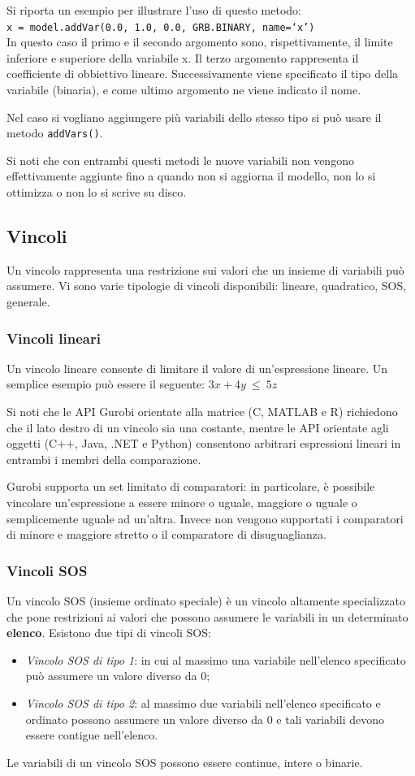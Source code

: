 Si riporta un esempio per illustrare l'uso di questo metodo:\\
\texttt{x = model.addVar(0.0, 1.0, 0.0, GRB.BINARY, name=`x')}\\
In questo caso il primo e il secondo argomento sono, rispettivamente, il limite inferiore e superiore della variabile x. Il terzo argomento rappresenta il coefficiente di obbiettivo lineare. Successivamente viene specificato il tipo della variabile (binaria), e come ultimo argomento ne viene indicato il nome.

Nel caso si vogliano aggiungere più variabili dello stesso tipo si può usare il metodo \texttt{addVars()}.

Si noti che con entrambi questi metodi le nuove variabili non vengono effettivamente aggiunte fino a quando non si aggiorna il modello, non lo si ottimizza o non lo si  scrive su disco.

\subsection{Vincoli}
Un vincolo rappresenta una restrizione sui valori che un insieme di variabili può assumere. Vi sono varie tipologie di vincoli disponibili: lineare, quadratico, SOS, generale.

\subsubsection*{Vincoli lineari}
Un vincolo lineare consente di limitare il valore di un'espressione lineare.
Un semplice esempio può essere il seguente:
$3x + 4y ~ \leq ~ 5z$

Si noti che le API Gurobi orientate alla matrice (C, MATLAB e R) richiedono che il lato destro di un vincolo sia una costante, mentre le API orientate agli oggetti (C++, Java, .NET e Python) consentono arbitrari espressioni lineari in entrambi i membri della comparazione.

Gurobi supporta un set limitato di comparatori: in particolare, è possibile vincolare un'espressione a essere minore o uguale, maggiore o uguale o semplicemente uguale ad un'altra. Invece non vengono supportati i comparatori di minore e maggiore stretto o il comparatore di disuguaglianza. 

\subsubsection*{Vincoli SOS}
Un vincolo SOS (insieme ordinato speciale) è un vincolo altamente specializzato che pone restrizioni ai valori che possono assumere le variabili in un determinato \textbf{elenco}.
Esistono due tipi di vincoli SOS:
\begin{itemize}
\item \textit{Vincolo SOS di tipo 1}: in cui al massimo una variabile nell'elenco specificato può assumere un valore diverso da 0;
\item \textit{Vincolo SOS di tipo 2}: al massimo due variabili nell'elenco specificato e ordinato possono assumere un valore diverso da 0 e tali variabili devono essere contigue nell'elenco.
\end{itemize}
Le variabili di un vincolo SOS possono essere continue, intere o binarie.

